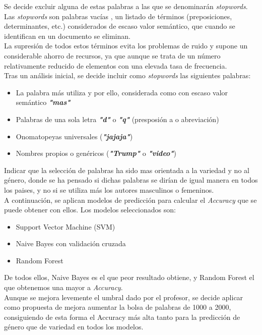 \documentclass[11pt,a4paper]{article}
\begin{document}
Se decide excluir alguna de estas palabras a las que se denominarán \textit{stopwords}. Las \textit{stopwords} son palabras vacías , un listado de términos (preposiciones, determinantes, etc.) considerados de escaso valor semántico, que cuando se identifican en un documento se eliminan.\\

La supresión de todos estos términos evita los problemas de ruido y supone un considerable ahorro de recursos, ya que aunque se trata de un número relativamente reducido de elementos con una elevada tasa de frecuencia.\\

Tras un análisis inicial, se decide incluir como \textit{stopwords} las siguientes palabras:
\begin{itemize}
  \item La palabra más utiliza y por ello, considerada como con escaso valor semántico \textbf{\textit{"mas"}} 
  \item Palabras de una sola letra \textbf{\textit{"d"}} o \textbf{\textit{"q"}} (presposión a o abreviación) 
    \item Onomatopeyas universales (\textbf{\textit{"jajaja"}})
  \item Nombres propios o genéricos (\textbf{\textit{"Trump"}} o \textbf{\textit{"video"}})
\end{itemize}

Indicar que la selección de palabras ha sido mas orientada a la variedad y no al género, donde se ha pensado si dichas palabras se dirían de igual manera en todos los paises, y no si se utiliza más los autores masculinos o femeninos.\\

A continuación, se aplican modelos de predicción para calcular el \textit{Accuracy} que se puede obtener con ellos. Los modelos seleccionados son:
\begin{itemize}
  \item Support Vector Machine (SVM)
  \item Naive Bayes con validación cruzada
  \item Random Forest
\end{itemize}
De todos ellos, Naive Bayes es el que peor resultado obtiene, y Random Forest el que obtenemos una mayor a \textit{Accuracy}.\\

Aunque se mejora levemente el umbral  dado por el profesor, se decide aplicar como propuesta de mejora aumentar la bolsa de palabras de 1000 a 2000, consiguiendo de esta forma el Accuracy más alta tanto para la predicción de género que de variedad en todos los modelos.\\
\end{document}
